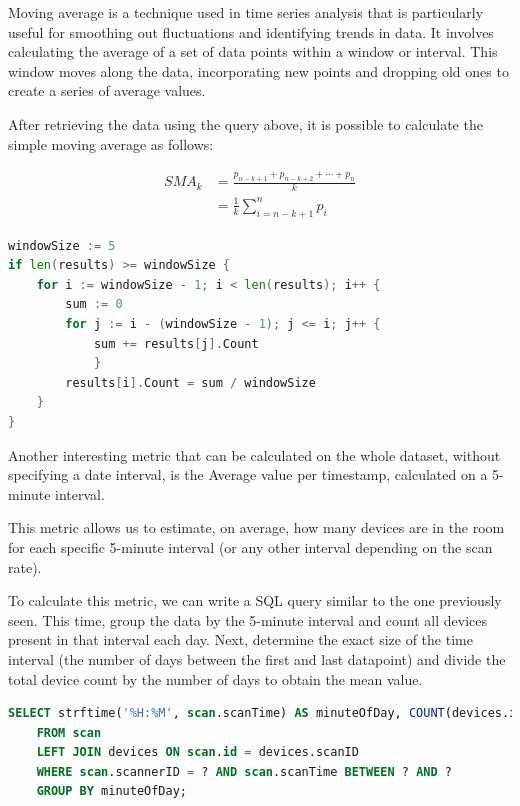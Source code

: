 \documentclass[a4paper, 11pt]{article}
\begin{document}
Moving average is a technique used in time series analysis that is particularly useful for smoothing out fluctuations and identifying trends in data. It involves calculating the average of a set of data points within a window or interval. This window moves along the data, incorporating new points and dropping old ones to create a series of average values.

After retrieving the data using the query above, it is possible to calculate the simple moving average as follows:

\begin{equation}
	{\displaystyle {\begin{aligned}{\textit {SMA}}_{k}&={\frac {p_{n-k+1}+p_{n-k+2}+\cdots +p_{n}}{k}}\\&={\frac {1}{k}}\sum _{i=n-k+1}^{n}p_{i}\end{aligned}}}
\end{equation}


\begin{lstlisting}[language=Go]
windowSize := 5
if len(results) >= windowSize {
	for i := windowSize - 1; i < len(results); i++ {
		sum := 0
		for j := i - (windowSize - 1); j <= i; j++ {
			sum += results[j].Count
			}
		results[i].Count = sum / windowSize
	}
}
\end{lstlisting}

Another interesting metric that can be calculated on the whole dataset, without specifying a date interval, is the Average value per timestamp, calculated on a 5-minute interval.

This metric allows us to estimate, on average, how many devices are in the room for each specific 5-minute interval (or any other interval depending on the scan rate).

To calculate this metric, we can write a SQL query similar to the one previously seen. This time, group the data by the 5-minute interval and count all devices present in that interval each day. Next, determine the exact size of the time interval (the number of days between the first and last datapoint) and divide the total device count by the number of days to obtain the mean value.

\begin{lstlisting}[language=SQL]
	SELECT strftime('%H:%M', scan.scanTime) AS minuteOfDay, COUNT(devices.id) AS averageValue
	FROM scan
	LEFT JOIN devices ON scan.id = devices.scanID
	WHERE scan.scannerID = ? AND scan.scanTime BETWEEN ? AND ?
	GROUP BY minuteOfDay;
\end{lstlisting}
\end{document}
